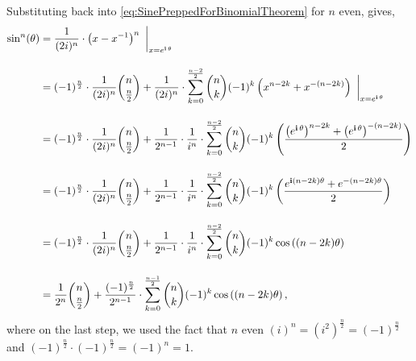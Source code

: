 Substituting back into \eqref{eq:SinePreppedForBinomialTheorem} for $n$ even, gives,
\begin{align*}
    \sin^n(\theta) &= \frac{1} {(2i)^n} \cdot \left( x - x^{-1}  \right)^n ~\bigg|_{x = e^{\mathop{\bm{\mathrm i}} \theta}} \\[1em] 
    &= (-1)^{\frac{n}{2}} \cdot \frac{1}{(2i)^n} \binom{n}{\frac{n}{2}} + \frac{1} {(2i)^n} \cdot \sum_{k=0}^{\frac{n-2}{2}} \binom{n}{k} (-1)^k \left( x^{n-2k} + x^{-(n-2k)}\right) ~\bigg|_{x = e^{\mathop{\bm{\mathrm i}} \theta}} \\[1em]
    &=  (-1)^{\frac{n}{2}} \cdot  \frac{1}{(2i)^n} \binom{n}{\frac{n}{2}} + \frac{1}{2^{n-1}} \cdot \frac{1}{i^{n}} \cdot \sum_{k=0}^{\frac{n-2}{2}} \binom{n}{k} (-1)^k \left( \frac{\left(e^{\mathop{\bm{\mathrm i}} \theta}\right)^{n-2k} + \left(e^{\mathop{\bm{\mathrm i}} \theta}\right)^{-(n-2k)}}{2} \right)\\[1em]
     &=  (-1)^{\frac{n}{2}} \cdot  \frac{1}{(2i)^n} \binom{n}{\frac{n}{2}} + \frac{1}{2^{n-1}} \cdot \frac{1}{i^{n}} \cdot \sum_{k=0}^{\frac{n-2}{2}} \binom{n}{k} (-1)^k \left( \frac{e^{\mathop{\bm{\mathrm i}} (n-2k)\theta}+ e^{-(n-2k)\theta}}{2} \right)\\[1em]
     &= (-1)^{\frac{n}{2}} \cdot  \frac{1}{(2i)^n} \binom{n}{\frac{n}{2}} + \frac{1}{2^{n-1}} \cdot \frac{1}{i^{n}} \cdot \sum_{k=0}^{\frac{n-2}{2}} \binom{n}{k} (-1)^k \cos\left((n-2k) \theta \right)\\[1em]
    &= \frac{1}{2^n} \binom{n}{\frac{n}{2}} + \frac{(-1)^{\frac{n}{2}}}{2^{n-1}}  \cdot\sum_{k=0}^{\frac{n-1}{2}} \binom{n}{k} (-1)^k \cos\left((n-2k) \theta \right),
\end{align*}
where on the last step, we used the fact that $n$ even  $(i)^{n} = (i^2)^{\frac{n}{2}} = (-1)^{\frac{n}{2}}$ and $(-1)^{\frac{n}{2}} \cdot (-1)^{\frac{n}{2}} = (-1)^n = 1$.
\Qed






